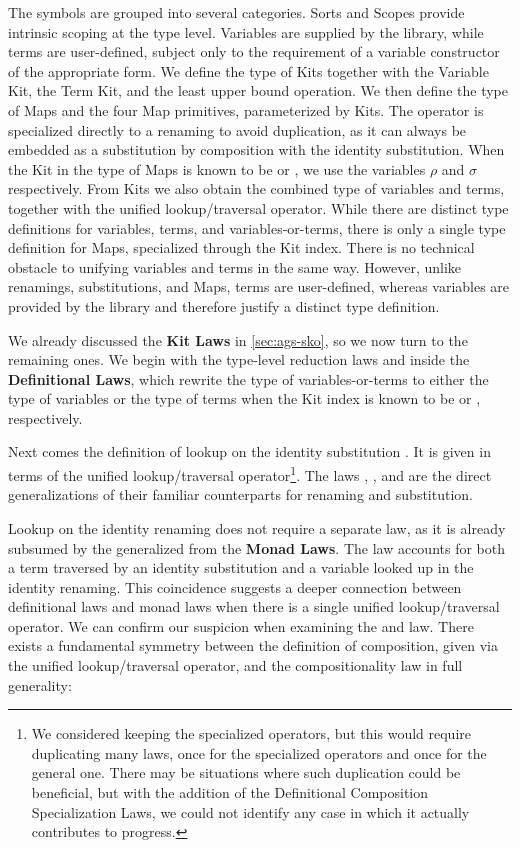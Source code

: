 \documentclass[screen,nonacm]{acmart}
\begin{document}
The symbols are grouped into several categories. Sorts and Scopes provide
intrinsic scoping at the type level. Variables are supplied by the library,
while terms are user-defined, subject only to the requirement of a variable
constructor of the appropriate form. We define the type of Kits together with
the Variable Kit, the Term Kit, and the least upper bound operation. We then
define the type of Maps and the four Map primitives, parameterized by Kits. The
operator  is specialized directly to a renaming to avoid
duplication, as it can always be embedded as a substitution by composition with
the identity substitution. When the Kit in the type of Maps is known to be
 or , we use the variables $ρ$ and $σ$
respectively. From Kits we also obtain the combined type of variables and
terms, together with the unified lookup/traversal operator. While there are
distinct type definitions for variables, terms, and variables-or-terms, there
is only a single type definition for Maps, specialized through the Kit index.
There is no technical obstacle to unifying variables and terms in the same way.
However, unlike renamings, substitutions, and Maps, terms are user-defined,
whereas variables are provided by the library and therefore justify a distinct
type definition.

We already discussed the \textbf{Kit Laws} in \cref{sec:ags-sko}, so we now
turn to the remaining ones. We begin with the type-level reduction laws
 and  inside the \textbf{Definitional
      Laws}, which rewrite the type of variables-or-terms to either the type of
variables or the type of terms when the Kit index is known to be
 or , respectively.

Next comes the definition of lookup on the identity substitution
. It is given in terms of the unified lookup/traversal
operator\footnote{We considered keeping the specialized operators, but this
      would require duplicating many laws, once for the specialized operators and
      once for the general one. There may be situations where such duplication could
      be beneficial, but with the addition of the Definitional Composition
      Specialization Laws, we could not identify any case in which it actually
      contributes to progress.}. The laws , , and
 are the direct generalizations of their familiar
counterparts for renaming and substitution.

Lookup on the identity renaming does not require a separate law, as it is
already subsumed by the generalized  from the \textbf{Monad
      Laws}. The  law accounts for both a term traversed by an
identity substitution and a variable looked up in the identity renaming. This
coincidence suggests a deeper connection between definitional laws and monad
laws when there is a single unified lookup/traversal operator. We can confirm
our suspicion when examining the  and
 law. There exists a fundamental symmetry between
the definition of composition, given via the unified lookup/traversal operator,
and the compositionality law in full generality:
\end{document}
